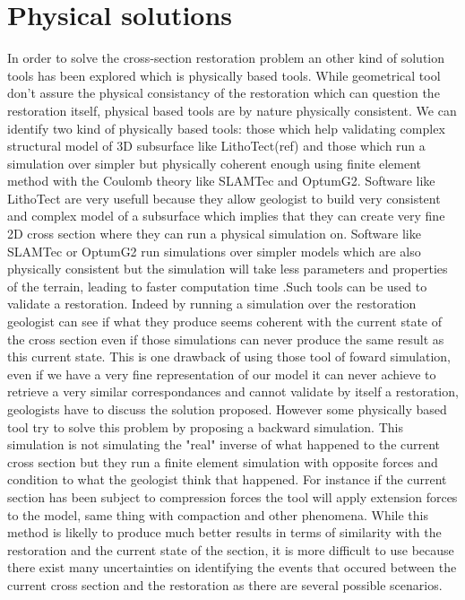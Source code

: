 \documentclass[12pt, a4paper]{memoir} %
\begin{document}
\section{Physical solutions}

In order to solve the cross-section restoration problem an other kind of solution tools has been explored which is physically based tools. While geometrical tool don't assure the physical consistancy of the restoration which can question the restoration itself, physical based tools are by nature physically consistent.  We can identify two kind of physically based tools: those which help validating complex structural model of 3D subsurface like LithoTect(ref) and those which run a simulation over simpler but physically coherent enough using finite element method with the Coulomb theory like SLAMTec and OptumG2.
Software like LithoTect are very usefull because they allow geologist to build very consistent and complex model of a subsurface which implies that they can create very fine 2D cross section where they can run a physical simulation on.
Software like SLAMTec or OptumG2 run simulations over simpler models which are also physically consistent but the simulation will take less parameters and properties of the terrain, leading to faster computation time .Such tools can be used to validate a restoration. Indeed by running a simulation over the restoration geologist can see if what they produce seems coherent with the current state of the cross section even if those simulations can never produce the same result as this current state. This is one drawback of using those tool of foward simulation, even if we have a very fine representation of our model it can never achieve to retrieve a very similar correspondances and cannot validate by itself a restoration, geologists have to discuss the solution proposed. However some physically based tool try to  solve this problem by proposing a backward simulation. This simulation is not simulating the "real" inverse of what happened to the current cross section but they run a finite element simulation with opposite forces and condition to what the geologist think that happened. For instance if the current section has been subject to compression forces the tool will apply extension forces to the model, same thing with compaction and other phenomena. While this method is likelly to produce much better results in terms of similarity with the restoration and the current state of the section, it is more difficult to use because there exist many uncertainties on identifying the events that occured between the current cross section and the restoration as there are several possible scenarios.
\end{document}
